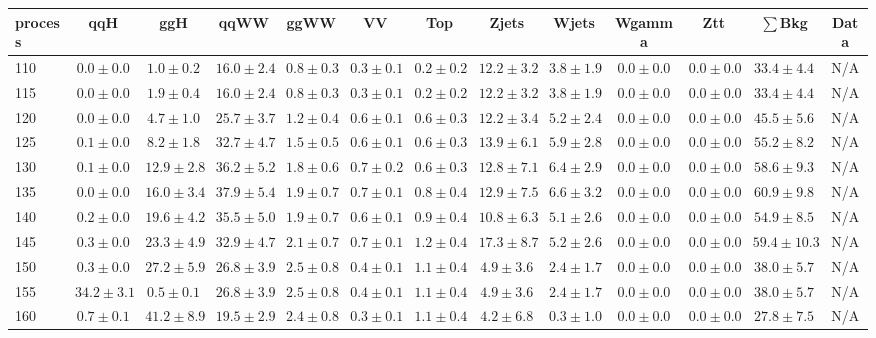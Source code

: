 \begin{table}
{%
 \tiny
 \begin{center}
 \begin{tabular}{l | c c | c c c c c c c c  | c c}
 \hline
 process & qqH & ggH & qqWW & ggWW & VV & Top & Zjets & Wjets & Wgamma & Ztt & $\sum$Bkg & Data \\
 \hline
110 & $0.0\pm0.0$ & $1.0\pm0.2$ & $16.0\pm2.4$ & $0.8\pm0.3$ & $0.3\pm0.1$ & $0.2\pm0.2$ & $12.2\pm3.2$ & $3.8\pm1.9$ & $0.0\pm0.0$ & $0.0\pm0.0$ & $33.4\pm4.4$ & N/A \\
115 & $0.0\pm0.0$ & $1.9\pm0.4$ & $16.0\pm2.4$ & $0.8\pm0.3$ & $0.3\pm0.1$ & $0.2\pm0.2$ & $12.2\pm3.2$ & $3.8\pm1.9$ & $0.0\pm0.0$ & $0.0\pm0.0$ & $33.4\pm4.4$ & N/A \\
120 & $0.0\pm0.0$ & $4.7\pm1.0$ & $25.7\pm3.7$ & $1.2\pm0.4$ & $0.6\pm0.1$ & $0.6\pm0.3$ & $12.2\pm3.4$ & $5.2\pm2.4$ & $0.0\pm0.0$ & $0.0\pm0.0$ & $45.5\pm5.6$ & N/A \\
125 & $0.1\pm0.0$ & $8.2\pm1.8$ & $32.7\pm4.7$ & $1.5\pm0.5$ & $0.6\pm0.1$ & $0.6\pm0.3$ & $13.9\pm6.1$ & $5.9\pm2.8$ & $0.0\pm0.0$ & $0.0\pm0.0$ & $55.2\pm8.2$ & N/A \\
130 & $0.1\pm0.0$ & $12.9\pm2.8$ & $36.2\pm5.2$ & $1.8\pm0.6$ & $0.7\pm0.2$ & $0.6\pm0.3$ & $12.8\pm7.1$ & $6.4\pm2.9$ & $0.0\pm0.0$ & $0.0\pm0.0$ & $58.6\pm9.3$ & N/A \\
135 & $0.0\pm0.0$ & $16.0\pm3.4$ & $37.9\pm5.4$ & $1.9\pm0.7$ & $0.7\pm0.1$ & $0.8\pm0.4$ & $12.9\pm7.5$ & $6.6\pm3.2$ & $0.0\pm0.0$ & $0.0\pm0.0$ & $60.9\pm9.8$ & N/A \\
140 & $0.2\pm0.0$ & $19.6\pm4.2$ & $35.5\pm5.0$ & $1.9\pm0.7$ & $0.6\pm0.1$ & $0.9\pm0.4$ & $10.8\pm6.3$ & $5.1\pm2.6$ & $0.0\pm0.0$ & $0.0\pm0.0$ & $54.9\pm8.5$ & N/A \\
145 & $0.3\pm0.0$ & $23.3\pm4.9$ & $32.9\pm4.7$ & $2.1\pm0.7$ & $0.7\pm0.1$ & $1.2\pm0.4$ & $17.3\pm8.7$ & $5.2\pm2.6$ & $0.0\pm0.0$ & $0.0\pm0.0$ & $59.4\pm10.3$ & N/A \\
150 & $0.3\pm0.0$ & $27.2\pm5.9$ & $26.8\pm3.9$ & $2.5\pm0.8$ & $0.4\pm0.1$ & $1.1\pm0.4$ & $4.9\pm3.6$ & $2.4\pm1.7$ & $0.0\pm0.0$ & $0.0\pm0.0$ & $38.0\pm5.7$ & N/A \\
155 & $34.2\pm3.1$ & $0.5\pm0.1$ & $26.8\pm3.9$ & $2.5\pm0.8$ & $0.4\pm0.1$ & $1.1\pm0.4$ & $4.9\pm3.6$ & $2.4\pm1.7$ & $0.0\pm0.0$ & $0.0\pm0.0$ & $38.0\pm5.7$ & N/A \\
160 & $0.7\pm0.1$ & $41.2\pm8.9$ & $19.5\pm2.9$ & $2.4\pm0.8$ & $0.3\pm0.1$ & $1.1\pm0.4$ & $4.2\pm6.8$ & $0.3\pm1.0$ & $0.0\pm0.0$ & $0.0\pm0.0$ & $27.8\pm7.5$ & N/A \\

\end{tabular}
\end{center}}
\end{table}

